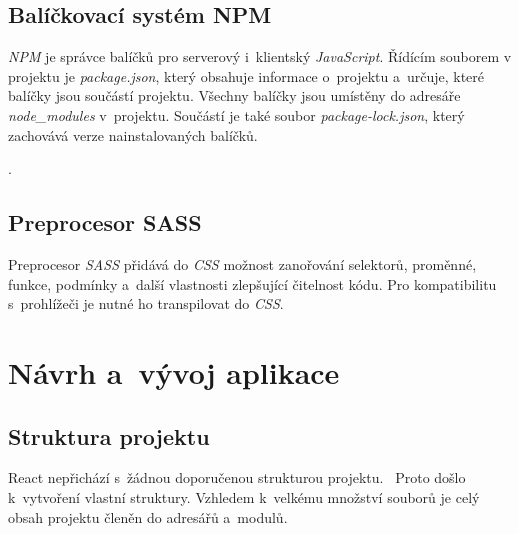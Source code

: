 \documentclass[a4paper,12pt]{article}
\begin{document}
\subsection{Balíčkovací systém NPM}

\textit{NPM} je správce balíčků pro serverový i~klientský \textit{JavaScript}. Řídícím souborem v projektu je \textit{package.json}, který obsahuje informace o~projektu a~určuje, které balíčky jsou součástí projektu.  Všechny balíčky jsou umístěny do adresáře \textit{node\_modules} v~projektu. Součástí je také soubor \textit{package-lock.json}, který zachovává verze nainstalovaných balíčků.~\cite{nodebook}

.

\vspace*{-1.5cm}
\subsection{Preprocesor SASS}

Preprocesor \textit{SASS} přidává do \textit{CSS} možnost zanořování selektorů, proměnné, funkce, podmínky a~další vlastnosti zlepšující čitelnost kódu. Pro kompatibilitu s~prohlížeči je nutné ho transpilovat do \textit{CSS}.~\cite{sass}

\section{Návrh a~vývoj aplikace}

\subsection{Struktura projektu}

React nepřichází s~žádnou doporučenou strukturou projektu.~\cite{filestructure} Proto došlo k~vytvoření vlastní struktury. Vzhledem k~velkému množství souborů je celý obsah projektu členěn do adresářů a~modulů.
\end{document}
